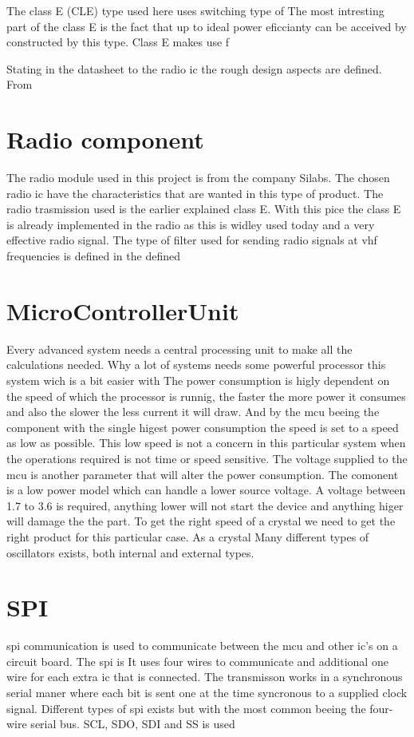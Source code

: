 \cite{class_e_new}

The class E (CLE) type used here uses switching type of 
The most intresting part of the class E is the fact that up to ideal power eficcianty can be acceived by constructed by this type. Class E makes use f

Stating in the datasheet to the radio \gls{ic} the rough design aspects are defined. From

\section{Radio component}
 The radio module used in this project is from the company Silabs. The chosen radio \gls{ic} have the characteristics that are wanted in this type of product. The radio trasmission used is the earlier explained class E. With this pice the class E is already implemented in the radio as this is widley used today and a very effective radio signal. 
The type of filter used for sending radio signals at \gls{vhf} frequencies is defined in the defined 

\section{MicroControllerUnit}
Every advanced system needs a central processing unit to make all the calculations needed. Why a lot of systems needs some powerful processor this system wich is a bit easier with 
The power consumption is higly dependent on the speed of which the processor is runnig, the faster the more power it consumes and also the slower the less current it will draw. And by the \gls{mcu} beeing the component with the single higest power consumption the speed is set to a speed as low as possible. This low speed is not a concern in this particular system when the operations required is not time or speed sensitive. The voltage supplied to the \gls{mcu} is another parameter that will alter the power consumption. The comonent is a low power model which can handle a lower source voltage. A voltage between 1.7 to 3.6 is required, anything lower will not start the device and anything higer will damage the the part. 
To get the right speed of a crystal we need to get the right product for this particular case. As a crystal 
Many different types of oscillators exists, both internal and external types. 

\section{SPI}
\gls{spi} communication is used to communicate between the \gls{mcu} and other \gls{ic}'s on a circuit board. \cite{pic_spi} The \gls{spi} is 
It uses four wires to communicate and additional one wire for each extra \gls{ic} that is connected. The transmisson works in a synchronous serial maner where each bit is sent one at the time syncronous to a supplied clock signal. Different types of \gls{spi} exists but with the most common beeing the four-wire serial bus. SCL, SDO, SDI and SS is used 

